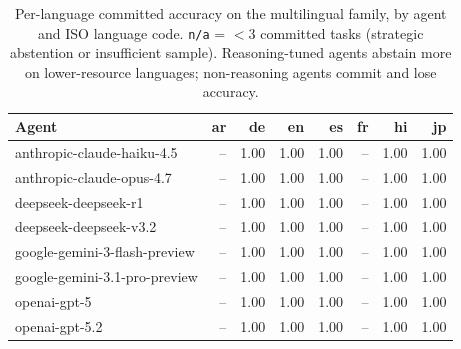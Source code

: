 \begin{table}[t]\centering\small
\caption{Per-language committed accuracy on the multilingual family, by agent and ISO language code. \texttt{n/a} = $<3$ committed tasks (strategic abstention or insufficient sample). Reasoning-tuned agents abstain more on lower-resource languages; non-reasoning agents commit and lose accuracy.}
\label{tab:multilingual-per-lang}
\begin{tabular}{lrrrrrrr}
\toprule
Agent & ar & de & en & es & fr & hi & jp \\
\midrule
anthropic-claude-haiku-4.5 & -- & 1.00 & 1.00 & 1.00 & -- & 1.00 & 1.00 \\
anthropic-claude-opus-4.7 & -- & 1.00 & 1.00 & 1.00 & -- & 1.00 & 1.00 \\
deepseek-deepseek-r1 & -- & 1.00 & 1.00 & 1.00 & -- & 1.00 & 1.00 \\
deepseek-deepseek-v3.2 & -- & 1.00 & 1.00 & 1.00 & -- & 1.00 & 1.00 \\
google-gemini-3-flash-preview & -- & 1.00 & 1.00 & 1.00 & -- & 1.00 & 1.00 \\
google-gemini-3.1-pro-preview & -- & 1.00 & 1.00 & 1.00 & -- & 1.00 & 1.00 \\
openai-gpt-5 & -- & 1.00 & 1.00 & 1.00 & -- & 1.00 & 1.00 \\
openai-gpt-5.2 & -- & 1.00 & 1.00 & 1.00 & -- & 1.00 & 1.00 \\
\bottomrule
\end{tabular}
\end{table}
